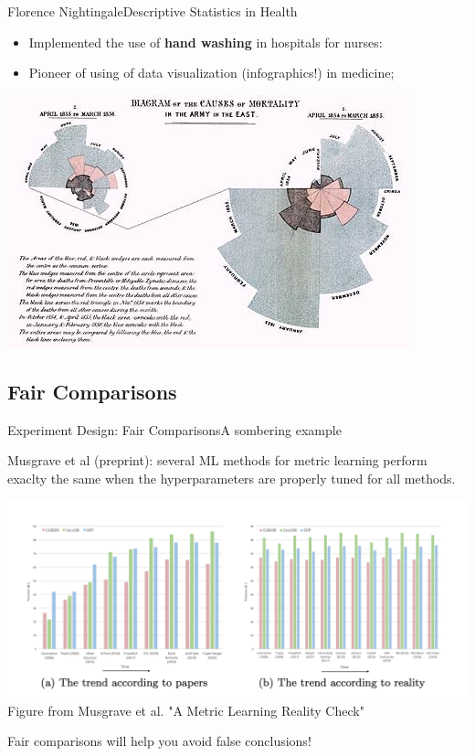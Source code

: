 \begin{frame}{Florence Nightingale}{Descriptive Statistics in Health}
  \begin{itemize}
    \item Implemented the use of {\bf hand washing} in hospitals for nurses:
    \item Pioneer of using of data visualization (infographics!) in medicine;
  \end{itemize}
  \begin{center}


    \includegraphics[width=.6\textwidth]{../img/florence_diagram}
  \end{center}
\end{frame}

\subsection{Fair Comparisons}

\begin{frame}{Experiment Design: Fair Comparisons}{A sombering example}

  Musgrave et al (preprint): several ML methods for metric learning perform exaclty the same when the hyperparameters are properly tuned for all methods.

  \begin{center}
    \includegraphics[width=.6\textwidth]{../img/musgrave_faircomparison}\\
    {\tiny Figure from Musgrave et al. "A Metric Learning Reality Check"}
  \end{center}

  \alert{Fair comparisons will help you avoid false conclusions!}
\end{frame}


